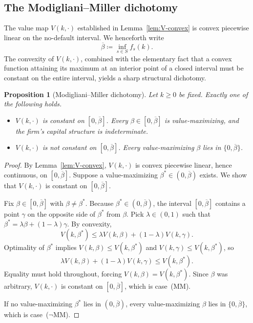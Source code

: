 \documentclass[11pt,a4paper,oneside]{book}
\def\leq{\leqslant}
\def\geq{\geqslant}
\theoremstyle{plain}
\newtheorem{proposition}[theorem]{Proposition}
\theoremstyle{definition}
\theoremstyle{remark}
\numberwithin{equation}{chapter}
\begin{document}
\subsection{The Modigliani--Miller dichotomy}
\label{subsec:mm-dichotomy}

The value map $V(k, \cdot)$ established in Lemma~\ref{lem:V-convex} is convex piecewise linear on the no-default interval. We henceforth write
\begin{equation*}
  \overline{\beta} \coloneqq \inf_{s \in S} f_s(k).
\end{equation*}
The convexity of $V(k, \cdot)$, combined with the elementary fact that a convex function attaining its maximum at an interior point of a closed interval must be constant on the entire interval, yields a sharp structural dichotomy.

\begin{proposition}[Modigliani--Miller dichotomy]\label{prop:mm-BGR}
Let $k \geq 0$ be fixed. Exactly one of the following holds.
\begin{itemize}
  \item[\textup{(MM)}] $V(k, \cdot)$ is constant on $[0, \overline{\beta}]$. Every $\beta \in [0, \overline{\beta}]$ is value-maximizing, and the firm's capital structure is indeterminate.
  \item[\textup{($\neg$MM)}] $V(k, \cdot)$ is not constant on $[0, \overline{\beta}]$. Every value-maximizing $\beta$ lies in $\{ 0, \overline{\beta} \}$.
\end{itemize}
\end{proposition}

\begin{proof}
By Lemma~\ref{lem:V-convex}, $V(k, \cdot)$ is convex piecewise linear, hence continuous, on $[0, \overline{\beta}]$. Suppose a value-maximizing $\beta^\ast \in (0, \overline{\beta})$ exists. We show that $V(k, \cdot)$ is constant on $[0, \overline{\beta}]$.

Fix $\beta \in [0, \overline{\beta}]$ with $\beta \neq \beta^\ast$. Because $\beta^\ast \in (0, \overline{\beta})$, the interval $[0, \overline{\beta}]$ contains a point $\gamma$ on the opposite side of $\beta^\ast$ from $\beta$. Pick $\lambda \in (0, 1)$ such that $\beta^\ast = \lambda \beta + (1 - \lambda) \gamma$. By convexity,
\begin{equation*}
  V(k, \beta^\ast) \leq \lambda V(k, \beta) + (1 - \lambda) V(k, \gamma).
\end{equation*}
Optimality of $\beta^\ast$ implies $V(k, \beta) \leq V(k, \beta^\ast)$ and $V(k, \gamma) \leq V(k, \beta^\ast)$, so
\begin{equation*}
  \lambda V(k, \beta) + (1 - \lambda) V(k, \gamma) \leq V(k, \beta^\ast).
\end{equation*}
Equality must hold throughout, forcing $V(k, \beta) = V(k, \beta^\ast)$. Since $\beta$ was arbitrary, $V(k, \cdot)$ is constant on $[0, \overline{\beta}]$, which is case~(MM).

If no value-maximizing $\beta^\ast$ lies in $(0, \overline{\beta})$, every value-maximizing $\beta$ lies in $\{0, \overline{\beta}\}$, which is case~($\neg$MM).
\end{proof}
\end{document}
